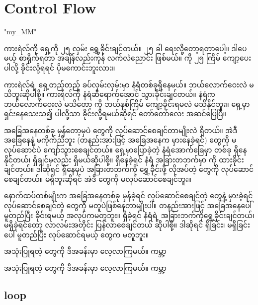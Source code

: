 \chapter{Control Flow}
\XeTeXlinebreaklocale "my_MM"  %
\begin{sloppypar}
\color{tungsten}
ကားရဲလ်ကို ရှေ့ကို ၂၅ လှမ်း ရွှေ့ခိုင်းချင်တယ်။  ၂၅ ခါ ရေးလို့‌တော့ရတာပေါ့။ ဒါပေမယ့် စာရိုက်ရတာ အချိန်လည်းကုန် လက်လဲညောင်း ဖြစ်မယ်။ {} ကို ၂၅ ကြိမ် ကျော့ပေးပါလို့ ခိုင်းလို့ရရင် ပိုမကောင်းဘူးလား။ 

ကားရဲလ်ရဲ့ ရှေ့တည့်တည့် ခပ်လှမ်းလှမ်းမှာ နံရံတစ်ခုရှိနေမယ်။ ဘယ်လောက်ဝေးလဲ မသိဘူးဆိုပါစို့။ ကားရဲလ်ကို နံရံဆီရောက်အောင် သွားခိုင်းချင်တယ်။ နံရံက ဘယ်လောက်ဝေးလဲ မသိတော့ {} ကို ဘယ်နှစ်ကြိမ် ကျော့ခိုင်းရမလဲ မသိနိုင်ဘူး။ ရှေ့မှာရှင်းနေသေးသ၍  ပါလို့သာ ခိုင်းလို့ရမယ်ဆိုရင် တော်တော်လေး အဆင်ပြေပြီ။  

အခြေအနေတစ်ခု မှန်တော့မှပဲ \mmcommand တွေကို လုပ်ဆောင်စေချင်တာမျိုးလဲ ရှိတယ်။ အဲဒီ အခြေနေနဲ့ မကိုက်ညီဘူး (တနည်းအားဖြင့် အခြေအနေက မှားနေခဲ့ရင်) \mmcommand တွေကို မလုပ်ဆောင်ပဲ ကျော်သွားစေချင်တယ်။ ရှေ့မှာပြောခဲ့တဲ့ နံရံအောက််ခြေမှာ \mmbeeper တစ်ခု ရှိနေနိုင်တယ်၊ ရှိချင်မှလည်း ရှိမယ်ဆိုပါစို့။ \mmbeeper ရှိနေခဲ့ရင် နံရံ အခြားတဘက်မှာ \mmbeeper ကို ထားခိုင်းချင်တယ်။  ဒါဆိုရင် \mmbeeper ရှိနေမှပဲ အခြားတဘက်ကို ရွှေ့ခိုင်းဖို့ လိုအပ်တဲ့ \mmcommand တွေကို လုပ်ဆောင်စေချင်တယ်။ \mmbeeper မရှိဘူးဆိုရင် အဲဒီ \mmcommand တွေကို မလုပ်ဆောင်စေချင်ဘူး။  

 နောက်ထပ်တစ်မျိုးက အခြေအနေတစ်ခု မှန်ခဲ့ရင် လုပ်ဆောင်စေချင်တဲ့ \mmcommand တွေနဲ့ မှားခဲ့ရင်‌ လုပ်ဆောင်စေချင်တဲ့ \mmcommand ‌တွေကို မတူပဲဖြစ်နေတာမျိုးပါ။ တနည်းအားဖြင့် အခြေအနေပေါ် မူတည်ပြီး ခိုင်းရမယ့် အလုပ်ကမတူဘူး။ \mmbeeper ရှိခဲ့ရင် နံရံရဲ့ အခြားဘက်ကိုရွှေ့ခိုင်းချင်တယ်၊ မရှိခဲ့ရင်တော့ လာလမ်းအတိုင်း ပြန်လာစေချင်တယ် ဆိုပါစို့။ ဒါဆိုရင် \mmbeeper ရှိခြင်း၊ မရှိခြင်းပေါ် မူတည်ပြီး လုပ်ဆောင်ရမယ့် \mmcommand တွေက မတူဘူး။ 


 အသုံးပြုရတဲ့  \color{tungsten} တွေကို  ဒီအခန်းမှာ ‌လေ့လာကြမယ်။ ကမ္ဘာ့

 အသုံးပြုရတဲ့  \color{tungsten} တွေကို  ဒီအခန်းမှာ ‌လေ့လာကြမယ်။ ကမ္ဘာ့

 

 \section{{} loop}


\end{sloppypar}
